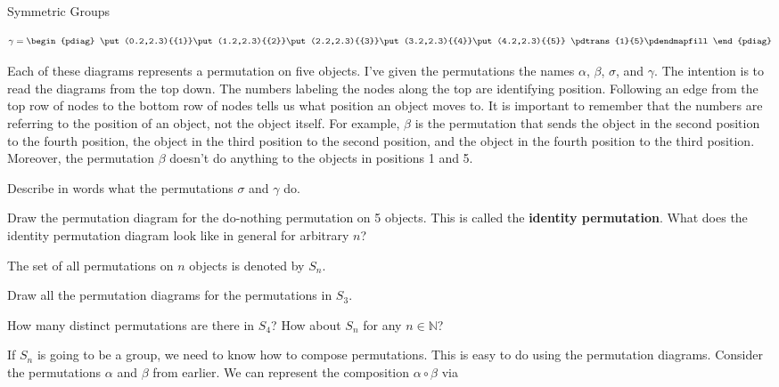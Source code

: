 \begin{section}{Symmetric Groups}
\begin{multicols}{2}
\[\gamma=\begin{pdiag}{5}{1}
\put(0.2,2.3){{1}}\put(1.2,2.3){{2}}\put(2.2,2.3){{3}}\put(3.2,2.3){{4}}\put(4.2,2.3){{5}}
\pdtrans{1}{5}\pdendmapfill 
\end{pdiag}\]
\end{multicols}
\noindent Each of these diagrams represents a permutation on five objects.  I've given the permutations the names \(\alpha\), \(\beta\), \(\sigma\), and \(\gamma\).  The intention is to read the diagrams from the top down.  The numbers labeling the nodes along the top are identifying position.  Following an edge from the top row of nodes to the bottom row of nodes tells us what position an object moves to.  It is important to remember that the numbers are referring to the position of an object, not the object itself.  For example, \(\beta\) is the permutation that sends the object in the second position to the fourth position, the object in the third position to the second position, and the object in the fourth position to the third position.  Moreover, the permutation \(\beta\) doesn't do anything to the objects in positions 1 and 5.

\begin{exercise}
Describe in words what the permutations \(\sigma\) and \(\gamma\) do.
\end{exercise}

\begin{exercise}
Draw the permutation diagram for the do-nothing permutation on 5 objects.  This is called the \textbf{identity permutation}. What does the identity permutation diagram look like in general for arbitrary \(n\)?
\end{exercise}

\begin{definition}
The set of all permutations on \(n\) objects is denoted by \(S_n\).
\end{definition}

\begin{exercise}
Draw all the permutation diagrams for the permutations in \(S_3\).
\end{exercise}

\begin{exercise}
How many distinct permutations are there in \(S_4\)?  How about \(S_n\) for any \(n\in \mathbb{N}\)?
\end{exercise}

If \(S_n\) is going to be a group, we need to know how to compose permutations.  This is easy to do using the permutation diagrams.  Consider the permutations \(\alpha\) and \(\beta\) from earlier.  We can represent the composition \(\alpha \circ \beta\) via


\end{section}
